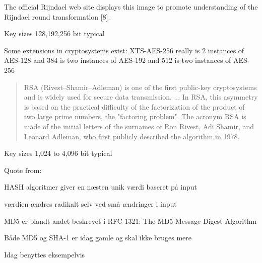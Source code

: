 \documentclass[Screen16to9,17pt]{foils}
\begin{document}
\begin{list2}
\item The official Rijndael web site displays this image to promote understanding of the Rijndael round transformation [8].
\item Key sizes 128,192,256 bit typical
\item Some extensions in cryptosystems exist: XTS-AES-256 really is 2 instances of AES-128 and 384 is two instances of AES-192 and 512 is two instances of AES-256
\item {}
\end{list2}



\begin{quote}
RSA (Rivest–Shamir–Adleman) is one of the first public-key cryptosystems and is widely used for secure data transmission. ...
In RSA, this asymmetry is based on the practical difficulty of the factorization of the product of two large prime numbers, the "factoring problem". The acronym RSA is made of the initial letters of the surnames of Ron Rivest, Adi Shamir, and Leonard Adleman, who first publicly described the algorithm in 1978.
\end{quote}

\begin{list2}
\item Key sizes 1,024 to 4,096 bit typical
\item  Quote from: 
\end{list2}




\begin{list1}
\item HASH algoritmer giver en næsten unik værdi baseret på input
\item værdien ændres radikalt selv ved små ændringer i input
\item MD5 er blandt andet beskrevet i RFC-1321: The MD5 Message-Digest
  Algorithm
\item Både MD5 og SHA-1 er idag gamle og skal ikke bruges mere
\item Idag benyttes eksempelvis 
\end{list1}
\end{document}
